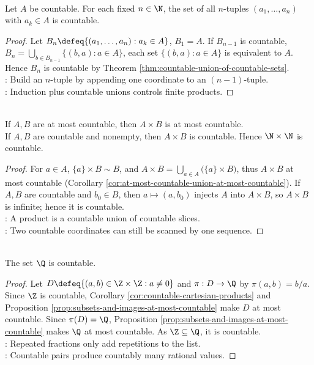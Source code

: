 \begin{theorem} \label{thm:finite-tuples-over-countable-set-countable} \\
Let $A$ be countable. For each fixed $n\in\N$, the set of all $n$-tuples $(a_1,\ldots,a_n)$ with $a_k\in A$ is countable.
\begin{proof} Let $B_n\defeq \{(a_1,\ldots,a_n): a_k\in A\}$, $B_1=A$. If $B_{n-1}$ is countable, $B_n=\bigcup\limits_{b\in B_{n-1}}\{(b,a):a\in A\}$, each set $\{(b,a):a\in A\}$ is equivalent to $A$. Hence $B_n$ is countable by Theorem \ref{thm:countable-union-of-countable-sets}.\\
: Build an $n$-tuple by appending one coordinate to an $(n-1)$-tuple.\\
: Induction plus countable unions controls finite products.
\end{proof}
\end{theorem}

\begin{corollary} \label{cor:countable-cartesian-products} \\
If $A,B$ are at most countable, then $A\times B$ is at most countable.\\
If $A,B$ are countable and nonempty, then $A\times B$ is countable. Hence $\N\times\N$ is countable.
\begin{proof}
For $a\in A$, $\{a\}\times B\sim B$, and $A\times B=\bigcup\limits_{a\in A}\bigl(\{a\}\times B\bigr)$, thus $A\times B$ at most countable (Corollary \ref{cor:at-most-countable-union-at-most-countable}). If $A,B$ are countable and $b_0\in B$, then $a\mapsto(a,b_0)$ injects $A$ into $A\times B$, so $A\times B$ is infinite; hence it is countable.\\
: A product is a countable union of countable slices.\\
: Two countable coordinates can still be scanned by one sequence.
\end{proof}
\end{corollary}

\begin{corollary} \label{cor:rationals-countable} \\
The set $\Q$ is countable.
\begin{proof}
Let $D\defeq\{(a,b)\in\Z\times\Z:a\neq0\}$ and $\pi:D\to\Q$ by $\pi(a,b)=b/a$.\\
Since $\Z$ is countable, Corollary \ref{cor:countable-cartesian-products} and Proposition \ref{prop:subsets-and-images-at-most-countable} make $D$ at most countable. Since $\pi(D)=\Q$, Proposition \ref{prop:subsets-and-images-at-most-countable} makes $\Q$ at most countable. As $\Z\subseteq\Q$, it is countable.\\
: Repeated fractions only add repetitions to the list.\\
: Countable pairs produce countably many rational values.
\end{proof}
\end{corollary}

